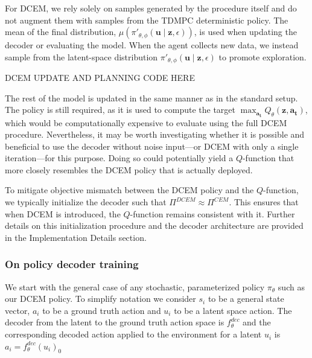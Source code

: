 \documentclass{article}
\begin{document}
For DCEM, we rely solely on samples generated by the procedure itself and do not augment them with samples from the TDMPC deterministic policy. The mean of the final distribution, $\mu(\pi'_{\theta,\phi}(\mathbf{u} \mid \mathbf{z}, \epsilon))$, is used when updating the decoder or evaluating the model. When the agent collects new data, we instead sample from the latent-space distribution $\pi'_{\theta,\phi}(\mathbf{u} \mid \mathbf{z}, \epsilon)$ to promote exploration.

DCEM UPDATE AND PLANNING CODE HERE

The rest of the model is updated in the same manner as in the standard setup. The policy is still required, as it is used to compute the target $\max_{\mathbf{a_t}} Q_\theta(\mathbf{z}, \mathbf{a_t})$, which would be computationally expensive to evaluate using the full DCEM procedure. Nevertheless, it may be worth investigating whether it is possible and beneficial to use the decoder without noise input—or DCEM with only a single iteration—for this purpose. Doing so could potentially yield a $Q$-function that more closely resembles the DCEM policy that is actually deployed.

To mitigate objective mismatch between the DCEM policy and the $Q$-function, we typically initialize the decoder such that $\Pi^{DCEM} \approx \Pi^{CEM}$. This ensures that when DCEM is introduced, the $Q$-function remains consistent with it. Further details on this initialization procedure and the decoder architecture are provided in the Implementation Details section.

\subsubsection{On policy decoder training}
We start with the general case of any stochastic, parameterized policy $\pi_\theta$ such as our DCEM policy. To simplify notation we consider $s_i$ to be a general state vector, $a_i$ to be a ground truth action and $u_i$ to be a latent space action. The decoder from the latent to the ground truth action space is $f^{dec}_\theta$ and the corresponding decoded action applied to the environment for a latent $u_i$ is $a_i=f^{dec}_\theta(u_i)_0$ 
\end{document}
